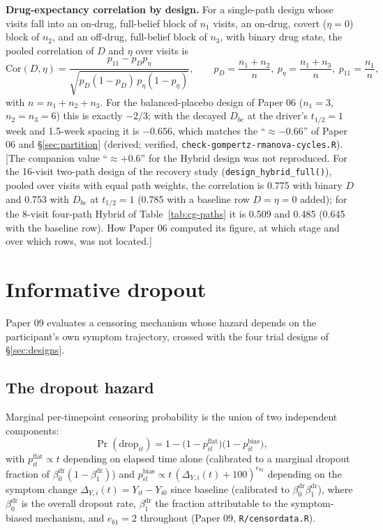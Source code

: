 \documentclass[11pt]{article}
\newcommand{\note}[1]{\textcolor{blue!60!black}{\small [#1]}}
\newcommand{\code}[1]{\texttt{#1}}
\begin{document}
\textbf{Drug-expectancy correlation by design.} For a single-path
design whose visits fall into an on-drug, full-belief block of $n_1$
visits, an on-drug, covert ($\eta = 0$) block of $n_2$, and an
off-drug, full-belief block of $n_3$, with binary drug state, the
pooled correlation of $D$ and $\eta$ over visits is
\begin{equation}
\mathrm{Cor}(D, \eta) = \frac{p_{11} - p_D p_\eta}
  {\sqrt{p_D(1 - p_D)\,p_\eta(1 - p_\eta)}}, \qquad
p_D = \frac{n_1 + n_2}{n}, \ p_\eta = \frac{n_1 + n_3}{n},\
p_{11} = \frac{n_1}{n},
\label{eq:invb-cor-de}
\end{equation}
with $n = n_1 + n_2 + n_3$. For the balanced-placebo design of Paper 06
($n_1 = 3$, $n_2 = n_3 = 6$) this is exactly $-2/3$; with the decayed
$D_{bc}$ at the driver's $t_{1/2} = 1$ week and 1.5-week spacing it is
$-0.656$, which matches the ``$\approx -0.66$'' of Paper 06 and
\S\ref{sec:partition} (derived; verified, \code{check-gompertz-rmanova-cycles.R}).
\note{The companion value ``$\approx +0.6$'' for the Hybrid design
was not reproduced. For the 16-visit two-path design of the recovery
study (\code{design\_hybrid\_full()}), pooled over visits with equal
path weights, the correlation is 0.775 with binary $D$ and 0.753 with
$D_{bc}$ at $t_{1/2} = 1$ (0.785 with a baseline row $D = \eta = 0$
added); for the 8-visit four-path Hybrid of Table~\ref{tab:cg-paths}
it is 0.509 and 0.485 (0.645 with the baseline row). How Paper 06
computed its figure, at which stage and over which rows, was not
located.}

\section{Informative dropout}
\label{sec:dropout}

Paper 09 evaluates a censoring mechanism whose hazard depends on the
participant's own symptom trajectory, crossed with the four trial
designs of \S\ref{sec:designs}.

\subsection{The dropout hazard}

Marginal per-timepoint censoring probability is the union of two
independent components:
\begin{equation}
\Pr(\mathrm{drop}_{it}) = 1 - \big(1 - p^{\mathrm{flat}}_{it}\big)
  \big(1 - p^{\mathrm{bias}}_{it}\big),
\label{eq:dropout-hazard}
\end{equation}
with $p^{\mathrm{flat}}_{it}\propto t$ depending on elapsed time alone
(calibrated to a marginal dropout fraction of
$\beta_0^{\mathrm{dr}}(1-\beta_1^{\mathrm{dr}})$) and
$p^{\mathrm{bias}}_{it}\propto t\,(\Delta_{Y,i}(t)+100)^{e_{b1}}$
depending on the symptom change $\Delta_{Y,i}(t) = Y_{it} - Y_{i0}$
since baseline (calibrated to
$\beta_0^{\mathrm{dr}}\beta_1^{\mathrm{dr}}$), where
$\beta_0^{\mathrm{dr}}$ is the overall dropout rate,
$\beta_1^{\mathrm{dr}}$ the fraction attributable to the
symptom-biased mechanism, and $e_{b1}=2$ throughout (Paper 09,
\code{R/censordata.R}).
\end{document}
